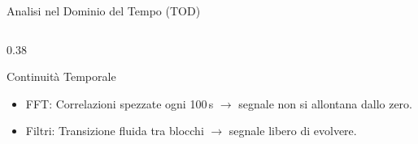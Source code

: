 \documentclass[10pt, aspectratio=169, handout]{beamer}
\begin{document}
\begin{frame}{Analisi nel Dominio del Tempo (TOD)}
\begin{columns}[c]
\begin{column}{0.38\textwidth}
      \vspace{0.2cm}

    \begin{alertblock}{Continuità Temporale}
        \fontsize{6pt}{7pt}\selectfont
        \begin{itemize}
          \item FFT: Correlazioni spezzate ogni 100\,s $\rightarrow$ segnale non si allontana dallo zero.
          \item Filtri: Transizione fluida tra blocchi $\rightarrow$ segnale libero di evolvere.
        \end{itemize}
      \end{alertblock}
      
    \end{column}
  \end{columns}


\end{frame}
\end{document}
